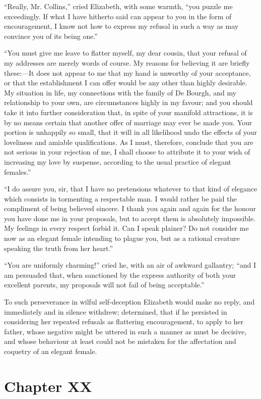 \documentclass[12pt,openright]{book}
\begin{document}
“Really, Mr. Collins,” cried Elizabeth, with some warmth, “you puzzle me exceedingly. If what I have hitherto said can appear to you in the form of encouragement, I know not how to express my refusal in such a way as may convince you of its being one.”

“You must give me leave to flatter myself, my dear cousin, that your refusal of my addresses are merely words of course. My reasons for believing it are briefly these:—It does not appear to me that my hand is unworthy of your acceptance, or that the establishment I can offer would be any other than highly desirable. My situation in life, my connections with the family of De Bourgh, and my relationship to your own, are circumstances highly in my favour; and you should take it into further consideration that, in spite of your manifold attractions, it is by no means certain that another offer of marriage may ever be made you. Your portion is unhappily so small, that it will in all likelihood undo the effects of your loveliness and amiable qualifications. As I must, therefore, conclude that you are not serious in your rejection of me, I shall choose to attribute it to your wish of increasing my love by suspense, according to the usual practice of elegant females.”

“I do assure you, sir, that I have no pretensions whatever to that kind of elegance which consists in tormenting a respectable man. I would rather be paid the compliment of being believed sincere. I thank you again and again for the honour you have done me in your proposals, but to accept them is absolutely impossible. My feelings in every respect forbid it. Can I speak plainer? Do not consider me now as an elegant female intending to plague you, but as a rational creature speaking the truth from her heart.”

“You are uniformly charming!” cried he, with an air of awkward gallantry; “and I am persuaded that, when sanctioned by the express authority of both your excellent parents, my proposals will not fail of being acceptable.”

To such perseverance in wilful self-deception Elizabeth would make no reply, and immediately and in silence withdrew; determined, that if he persisted in considering her repeated refusals as flattering encouragement, to apply to her father, whose negative might be uttered in such a manner as must be decisive, and whose behaviour at least could not be mistaken for the affectation and coquetry of an elegant female.

\chapter{Chapter XX}
\end{document}
